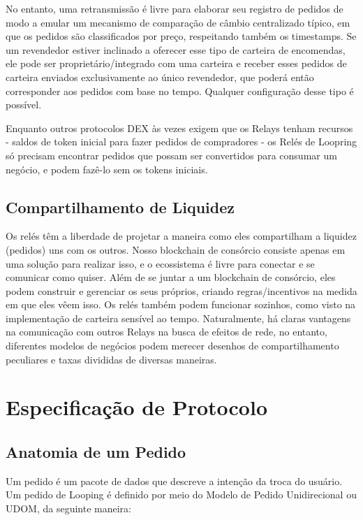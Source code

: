 \documentclass[UTF8,nofonts]{article}
\begin{document}
\begin{multicols}{2}
No entanto, uma retransmissão é livre para elaborar seu registro de pedidos de modo a emular um mecanismo de comparação de câmbio centralizado típico, em que os pedidos são classificados por preço, respeitando também os timestamps. Se um revendedor estiver inclinado a oferecer esse tipo de carteira de encomendas, ele pode ser proprietário/integrado com uma carteira e receber esses pedidos de carteira enviados exclusivamente ao único revendedor, que poderá então corresponder aos pedidos com base no tempo. Qualquer configuração desse tipo é possível.


Enquanto outros protocolos DEX às vezes exigem que os Relays tenham recursos - saldos de token inicial para fazer pedidos de compradores - os Relés de Loopring só precisam encontrar pedidos que possam ser convertidos para consumar um negócio, e podem fazê-lo sem os tokens iniciais.

\subsection{Compartilhamento de Liquidez\label{sec:liquidity_sharing}}
Os relés têm a liberdade de projetar a maneira como eles compartilham a liquidez (pedidos) uns com os outros. Nosso blockchain de consórcio consiste apenas em uma solução para realizar isso, e o ecossistema é livre para conectar e se comunicar como quiser. Além de se juntar a um blockchain de consórcio, eles podem construir e gerenciar os seus próprios, criando regras/incentivos na medida em que eles vêem isso. Os relés também podem funcionar sozinhos, como visto na implementação de carteira sensível ao tempo. Naturalmente, há claras vantagens na comunicação com outros Relays na busca de efeitos de rede, no entanto, diferentes modelos de negócios podem merecer desenhos de compartilhamento peculiares e taxas divididas de diversas maneiras.

\section{Especificação de Protocolo\label{sec:protocol}}

\subsection{Anatomia de um Pedido\label{anatomy}}
Um pedido é um pacote de dados que descreve a intenção da troca do usuário. Um pedido de Looping é definido por meio do Modelo de Pedido Unidirecional ou UDOM, da seguinte maneira:


\end{multicols}
\end{document}
